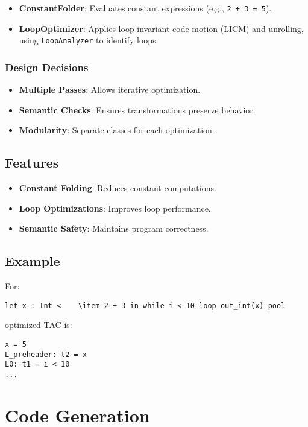 \documentclass[11pt, titlepage]{article}
\begin{document}
\begin{itemize}[leftmargin=*]
    \item \textbf{ConstantFolder}: Evaluates constant expressions (e.g., \texttt{2 + 3 = 5}).
    \item \textbf{LoopOptimizer}: Applies loop-invariant code motion (LICM) and unrolling, using \texttt{LoopAnalyzer} to identify loops.
\end{itemize}

\subsubsection{Design Decisions}

\begin{itemize}[leftmargin=*]
    \item \textbf{Multiple Passes}: Allows iterative optimization.
    \item \textbf{Semantic Checks}: Ensures transformations preserve behavior.
    \item \textbf{Modularity}: Separate classes for each optimization.
\end{itemize}

\subsection{Features}
\begin{itemize}[leftmargin=*]
    \item \textbf{Constant Folding}: Reduces constant computations.
    \item \textbf{Loop Optimizations}: Improves loop performance.
    \item \textbf{Semantic Safety}: Maintains program correctness.
\end{itemize}

\subsection{Example}
For:
\begin{lstlisting}
let x : Int <    \item 2 + 3 in while i < 10 loop out_int(x) pool
\end{lstlisting}
optimized TAC is:
\begin{lstlisting}
x = 5
L_preheader: t2 = x
L0: t1 = i < 10
...
\end{lstlisting}

\section{Code Generation}
\label{sec:codegen}
\end{document}
